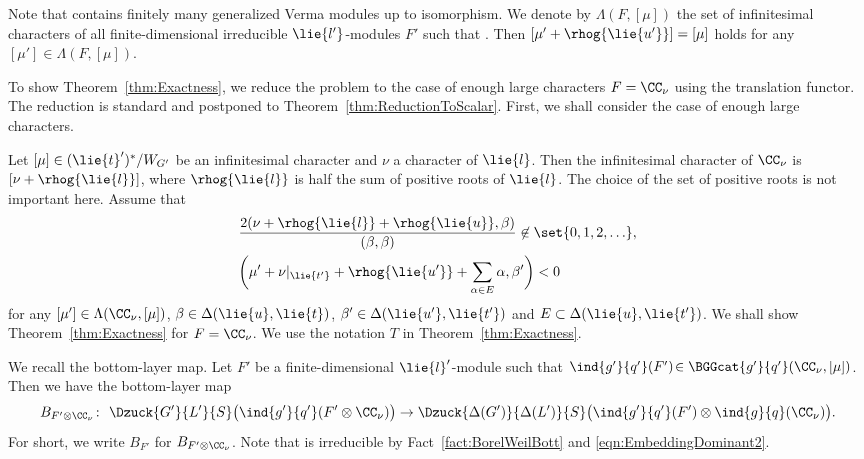 Note that  contains finitely many generalized Verma modules  up to isomorphism.
We denote by $\Lambda(F, [\mu])$ the set of infinitesimal characters of all finite-dimensional irreducible $\lie{l'}$-modules $F'$ such that .
Then $[\mu' + \rhog{\lie{u'}}] = [\mu]$ holds for any~${[\mu'] \in \Lambda(F, [\mu])}$.

To show Theorem~\ref{thm:Exactness}, we reduce the problem to the case of enough large characters $F = \CC_\nu$ using the translation functor.
The reduction is standard and postponed to Theorem~\ref{thm:ReductionToScalar}.
First, we shall consider the case of enough large characters.

Let $[\mu] \in (\lie{t}')^*/W_{G'}$ be an infinitesimal character and $\nu$ a character of $\lie{l}$.
Then the infinitesimal character of $\CC_{\nu}$ is $[\nu + \rhog{\lie{l}}]$, where $\rhog{\lie{l}}$ is half the sum of positive roots of $\lie{l}$.
The choice of the set of positive roots is not important here.
Assume that
\begin{align}
	&\frac{2(\nu + \rhog{\lie{l}} + \rhog{\lie{u}}, \beta)}{(\beta, \beta)} \not\in \set{0, 1, 2, \ldots}, \label{eqn:EmbeddingDominant1} \\
	&\biggl(\mu' + \nu|_{\lie{t'}} + \rhog{\lie{u'}} + \sum_{\alpha \in E} \alpha, \beta'\biggr) < 0 \label{eqn:EmbeddingDominant2}
\end{align}
for any $[\mu'] \in \Lambda(\CC_{\nu}, [\mu])$, $\beta \in \Delta(\lie{u}, \lie{t})$, $\beta' \in \Delta(\lie{u'}, \lie{t'})$ and $E\subset \Delta(\lie{u}, \lie{t'})$.
We shall show Theorem~\ref{thm:Exactness} for $F = \CC_\nu$.
We use the notation $T$ in Theorem~\ref{thm:Exactness}.

We recall the bottom-layer map.
Let $F'$ be a finite-dimensional $\lie{l}'$-module such that $\smash{\ind{g'}{q'}(F')}\! \in \smash{\BGGcat{g'}{q'}(\CC_\nu, [\mu])}$.
Then we have the bottom-layer map
\begin{align*}
	B_{F'\otimes \CC_{\nu}}\colon\ \Dzuck{G'}{L'}{S}\bigl(\ind{g'}{q'}(F'\otimes \CC_{\nu})\bigr) \rightarrow \Dzuck{\Delta(G')}{\Delta(L')}{S}\bigl(\ind{g'}{q'}(F')\otimes \ind{g}{q}(\CC_{\nu})\bigr).
\end{align*}
For short, we write $B_{F'}$ for $B_{F'\otimes \CC_{\nu}}$.
Note that  is irreducible by Fact~\ref{fact:BorelWeilBott} and \eqref{eqn:EmbeddingDominant2}.


